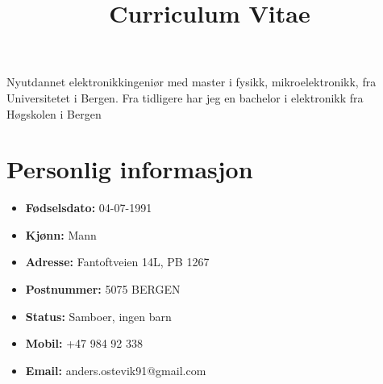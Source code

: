 \documentclass[11pt,a4paper,sans,norsk]{moderncv}        %
\title{Curriculum Vitae}                               %
\begin{document}
\makecvtitle

\small{Nyutdannet elektronikkingeniør med master i fysikk, mikroelektronikk, fra Universitetet i Bergen. Fra tidligere har jeg en bachelor i elektronikk fra Høgskolen i Bergen}

\section{Personlig informasjon}

\begin{minipage}{0.45\textwidth}
	{\renewcommand\labelitemi{}
	\begin{itemize}
	\vspace{3pt}
	\item{\textbf{Fødselsdato:}	04-07-1991}
	\vspace{3pt}
	\item{\textbf{Kjønn:}	Mann}
	\vspace{3pt}
	\item{\textbf{Adresse:}	Fantoftveien 14L, PB 1267}
	\vspace{3pt}
	\item{\textbf{Postnummer:}	5075 BERGEN}
	\vspace{3pt}
	\item{\textbf{Status:}	Samboer, ingen barn}
	\vspace{3pt}
	\item{\textbf{Mobil:}	+47 984 92 338}
	\vspace{3pt}
	\item{\textbf{Email:}	anders.ostevik91@gmail.com}

	\end{itemize}
	}
\end{minipage} \hfill
\begin{minipage}{0.85\textwidth}
	\begin{figure}[H]
	\setlength{\fboxsep}{1pt}
	\setlength{\fboxrule}{0.1pt}
	\end{figure}
\end{minipage}
\end{document}
